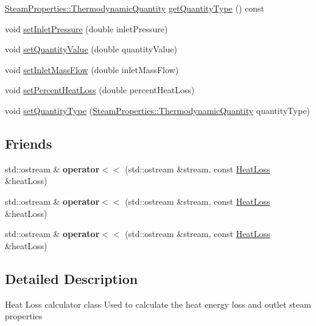 \begin{DoxyCompactItemize}
\hyperlink{class_steam_properties_ae0294bedf7d178c2d8fb6aed0f62fbff}{Steam\+Properties\+::\+Thermodynamic\+Quantity} \hyperlink{class_heat_loss_a92dc973c0fd81df192207b3df55d6c2b}{get\+Quantity\+Type} () const
\item 
void \hyperlink{class_heat_loss_ab0a6b1f2a964d161d25758318f25f7e3}{set\+Inlet\+Pressure} (double inlet\+Pressure)
\item 
void \hyperlink{class_heat_loss_ae6b6c4ac28471d7bc94e3886c48a90bd}{set\+Quantity\+Value} (double quantity\+Value)
\item 
void \hyperlink{class_heat_loss_ac4154dc9922b6ddf3f2e7a10cc64c61f}{set\+Inlet\+Mass\+Flow} (double inlet\+Mass\+Flow)
\item 
void \hyperlink{class_heat_loss_a2a4a80b16c1f975e194ae466b20d46bd}{set\+Percent\+Heat\+Loss} (double percent\+Heat\+Loss)
\item 
void \hyperlink{class_heat_loss_a7c125f1137f31eba8826a1aa3b905290}{set\+Quantity\+Type} (\hyperlink{class_steam_properties_ae0294bedf7d178c2d8fb6aed0f62fbff}{Steam\+Properties\+::\+Thermodynamic\+Quantity} quantity\+Type)
\end{DoxyCompactItemize}
\subsection*{Friends}
\begin{DoxyCompactItemize}
\item 
\mbox{\label{class_heat_loss_ae802a6c38494b03cb22a54b603f87fa9}} 
std\+::ostream \& {\bfseries operator$<$$<$} (std\+::ostream \&stream, const \hyperlink{class_heat_loss}{Heat\+Loss} \&heat\+Loss)
\item 
\mbox{\label{class_heat_loss_ae802a6c38494b03cb22a54b603f87fa9}} 
std\+::ostream \& {\bfseries operator$<$$<$} (std\+::ostream \&stream, const \hyperlink{class_heat_loss}{Heat\+Loss} \&heat\+Loss)
\item 
\mbox{\label{class_heat_loss_ae802a6c38494b03cb22a54b603f87fa9}} 
std\+::ostream \& {\bfseries operator$<$$<$} (std\+::ostream \&stream, const \hyperlink{class_heat_loss}{Heat\+Loss} \&heat\+Loss)
\end{DoxyCompactItemize}


\subsection{Detailed Description}
Heat Loss calculator class Used to calculate the heat energy loss and outlet steam properties 

